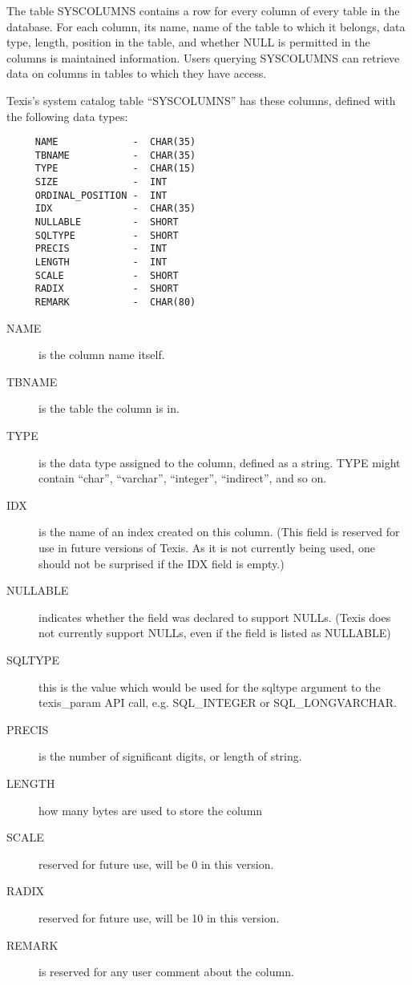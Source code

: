 The table SYSCOLUMNS contains a row for every column of every table
in the database.  For each column, its name, name of the table to
which it belongs, data type, length, position in the table, and
whether NULL is permitted in the columns is maintained information.
Users querying SYSCOLUMNS can retrieve data on columns in tables to
which they have access.

Texis's system catalog table ``SYSCOLUMNS'' has these columns, defined
with the following data types:

\begin{verbatim}
     NAME             -  CHAR(35)
     TBNAME           -  CHAR(35)
     TYPE             -  CHAR(15)
     SIZE             -  INT
     ORDINAL_POSITION -  INT
     IDX              -  CHAR(35)
     NULLABLE         -  SHORT
     SQLTYPE          -  SHORT
     PRECIS           -  INT
     LENGTH           -  INT
     SCALE            -  SHORT
     RADIX            -  SHORT
     REMARK           -  CHAR(80)
\end{verbatim}

\begin{description}
\item[NAME] is the column name itself.

\item[TBNAME] is the table the column is in.

\item[TYPE] is the data type assigned to the column, defined as a
string.  TYPE might contain ``char'', ``varchar'', ``integer'',
``indirect'', and so on.

\item[IDX] is the name of an index created on this column.  (This
field is reserved for use in future versions of Texis.  As it is not
currently being used, one should not be surprised if the IDX field
is empty.)

\item[NULLABLE] indicates whether the field was declared to support NULLs.
(Texis does not currently support NULLs, even if the field is listed as
NULLABLE)

\item[SQLTYPE] this is the value which would be used for the sqltype
argument to the texis\_param API call, e.g. SQL\_INTEGER or SQL\_LONGVARCHAR.

\item[PRECIS] is the number of significant digits, or length of string.

\item[LENGTH] how many bytes are used to store the column

\item[SCALE] reserved for future use, will be 0 in this version.

\item[RADIX] reserved for future use, will be 10 in this version.

\item[REMARK] is reserved for any user comment about the column.
\end{description}

